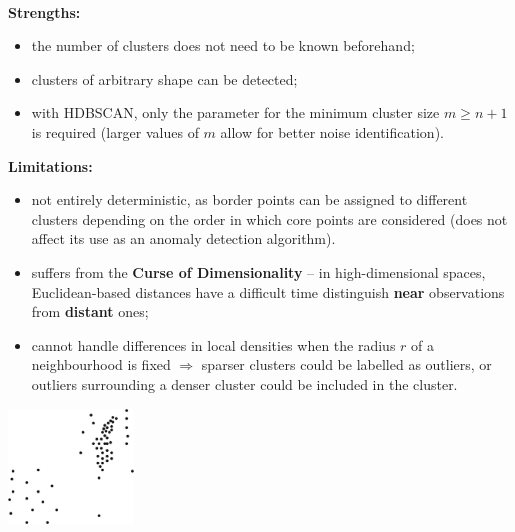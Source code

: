 \documentclass[20pt,landscape,footrule,headrule]{foils}
\begin{document}
{{\newpage\ \\ \noindent \textbf{Strengths:} 
\begin{itemize}
\item the number of clusters does not need to be known beforehand; \item clusters of arbitrary shape can be detected; 
\item with HDBSCAN, only the parameter for the minimum cluster size $m\geq n+1$ is required  (larger values of $m$ allow for better noise identification).
\end{itemize} \textbf{Limitations:}
\begin{itemize}
\item not entirely deterministic, as border points can be assigned to different clusters depending on the order in which core points are considered (does not affect its use as an anomaly detection algorithm).
\newpage\ \item suffers from the \textbf{Curse of Dimensionality} -- in high-dimensional spaces,  Euclidean-based distances have a difficult time distinguish \textbf{near} observations from \textbf{distant} ones; \item  cannot handle differences in local densities when the radius $r$  of a neighbourhood  is fixed $\Longrightarrow$ sparser clusters could be  labelled as outliers, or outliers surrounding a denser cluster could be included in the cluster.
\end{itemize}
\begin{center}
\includegraphics[width=0.25\textwidth]{Images/clustering4}
\end{center}





}}
\end{document}
